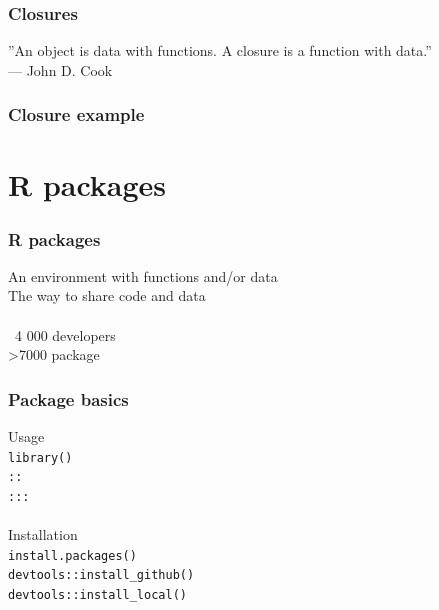 \documentclass{beamer}
\begin{document}
\begin{frame}
	\frametitle{Closures}
	\begin{center}
		''An object is data with functions. A closure is a function with 
		data.'' \\ 
		— John D. Cook
	\end{center}
\end{frame}


\begin{frame}
	\frametitle{Closure example}
	\lstClosure
\end{frame}

\section{R packages}

\begin{frame}
	\frametitle{R packages}
	\begin{center}
		An environment with functions and/or data \\
		The way to share code and data \\~\\
		~4 000 developers \\
		\textgreater 7000 package \\
	\end{center}
\end{frame}

\begin{frame}
	\frametitle{Package basics}
	\begin{center}
		Usage \\
		\texttt{library()} \\
		\texttt{::} \\
		\texttt{:::} \\~\\
		Installation \\
		\texttt{install.packages()} \\
		\texttt{devtools::install\_github()} \\
		\texttt{devtools::install\_local()} \\
	\end{center}
\end{frame}
\end{document}
